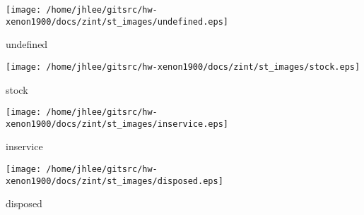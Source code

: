 \noindent
\vspace{1.4cm}
\begin{minipage}{.2\textwidth}
\begin{center}
\texttt{[image: /home/jhlee/gitsrc/hw-xenon1900/docs/zint/st\_images/undefined.eps]}
\end{center}
\end{minipage}
\begin{minipage}{.7\textwidth}
undefined
\end{minipage}


\noindent
\vspace{1.4cm}
\begin{minipage}{.2\textwidth}
\begin{center}
\texttt{[image: /home/jhlee/gitsrc/hw-xenon1900/docs/zint/st\_images/stock.eps]}
\end{center}
\end{minipage}
\begin{minipage}{.7\textwidth}
stock
\end{minipage}


\noindent
\vspace{1.4cm}
\begin{minipage}{.2\textwidth}
\begin{center}
\texttt{[image: /home/jhlee/gitsrc/hw-xenon1900/docs/zint/st\_images/inservice.eps]}
\end{center}
\end{minipage}
\begin{minipage}{.7\textwidth}
inservice
\end{minipage}


\noindent
\vspace{1.4cm}
\begin{minipage}{.2\textwidth}
\begin{center}
\texttt{[image: /home/jhlee/gitsrc/hw-xenon1900/docs/zint/st\_images/disposed.eps]}
\end{center}
\end{minipage}
\begin{minipage}{.7\textwidth}
disposed
\end{minipage}


